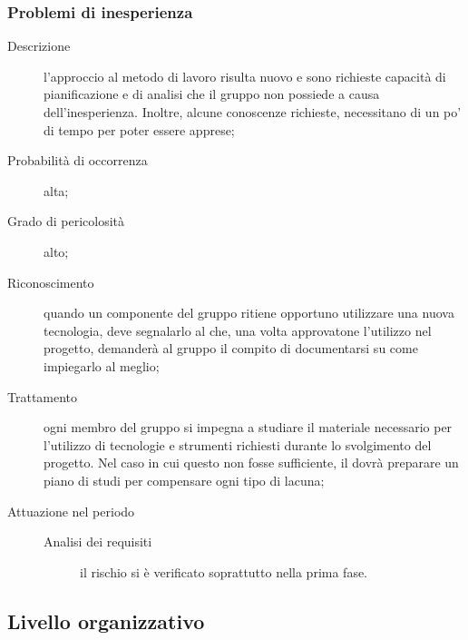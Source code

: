 		\subsubsection{Problemi di inesperienza}
		\begin{description}
			\item[Descrizione] l'approccio al metodo di lavoro risulta nuovo e sono richieste capacità di pianificazione e di analisi che il gruppo non possiede a causa dell'inesperienza. Inoltre, alcune conoscenze richieste, necessitano di un po' di tempo per poter essere apprese;
			\item[Probabilità di occorrenza] alta;
			\item[Grado di pericolosità] alto;
			\item[Riconoscimento] quando un componente del gruppo ritiene opportuno utilizzare una nuova tecnologia, deve segnalarlo al \R{} che, una volta approvatone l'utilizzo nel progetto, demanderà al gruppo il compito di documentarsi su come 	impiegarlo al meglio;
			\item[Trattamento] ogni membro del gruppo si impegna a studiare il materiale necessario per l'utilizzo di tecnologie e strumenti richiesti durante lo svolgimento del progetto. Nel caso in cui questo non fosse sufficiente, il \R{} dovrà preparare un piano di studi per compensare ogni tipo di lacuna;
			\item[Attuazione nel periodo]
			\begin{description}
				\item[Analisi dei requisiti]  il rischio si è verificato soprattutto nella prima fase.
			\end{description}
		\end{description}
	\subsection{Livello organizzativo} \label{sec:org}

